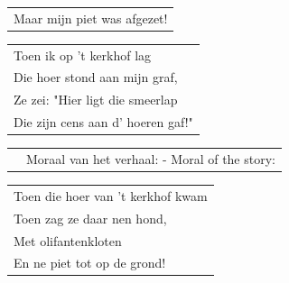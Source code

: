\documentclass{article}
\begin{document}
\begin{flushleft}
\begin{tabularx}{0.8\textwidth} {
   >{\raggedright\arraybackslash}X}
Maar mijn piet was afgezet!\\
\end{tabularx}
\end{flushleft}\begin{flushleft}
\begin{tabularx}{0.8\textwidth} {
   >{\raggedright\arraybackslash}X}Toen ik op ’t kerkhof lag\\
Die hoer stond aan mijn graf,\\
Ze zei: "Hier ligt die smeerlap\\
Die zijn cens aan d’ hoeren gaf!"\\
\end{tabularx}
\end{flushleft}\begin{flushleft}
\begin{tabularx}{0.8\textwidth} {
   c >{\raggedright\arraybackslash}X}
\hspace{5mm} & {\small Moraal van het verhaal: - Moral of the story:}
\end{tabularx}
\end{flushleft}\begin{flushleft}
\begin{tabularx}{0.8\textwidth} {
   >{\raggedright\arraybackslash}X}
Toen die hoer van ’t kerkhof kwam\\
Toen zag ze daar nen hond,\\
Met olifantenkloten\\
En ne piet tot op de grond!\\
\end{tabularx}
\end{flushleft}
\newpage
\end{document}
